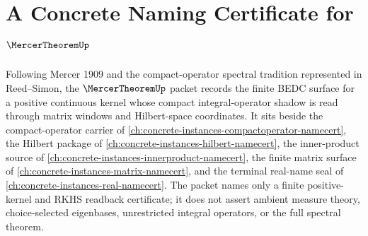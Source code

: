 \chapter{A Concrete Naming Certificate for $\MercerTheoremUp$}
\label{ch:concrete-instances-mercer-theorem-namecert}

Following Mercer 1909 and the compact-operator spectral tradition represented in Reed--Simon, the $\MercerTheoremUp$ packet records the finite BEDC surface for a positive continuous kernel whose compact integral-operator shadow is read through matrix windows and Hilbert-space coordinates. It sits beside the compact-operator carrier of \autoref{ch:concrete-instances-compactoperator-namecert}, the Hilbert package of \autoref{ch:concrete-instances-hilbert-namecert}, the inner-product source of \autoref{ch:concrete-instances-innerproduct-namecert}, the finite matrix surface of \autoref{ch:concrete-instances-matrix-namecert}, and the terminal real-name seal of \autoref{ch:concrete-instances-real-namecert}. The packet names only a finite positive-kernel and RKHS readback certificate; it does not assert ambient measure theory, choice-selected eigenbases, unrestricted integral operators, or the full spectral theorem.

